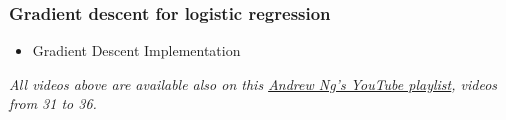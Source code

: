 \subsubsection*{Gradient descent for logistic regression}
\begin{itemize}
  \item Gradient Descent Implementation
\end{itemize}


\emph{All videos above are available also on this \href{https://youtube.com/playlist?list=PLkDaE6sCZn6FNC6YRfRQc_FbeQrF8BwGI&feature=shared}{Andrew Ng's YouTube playlist}, videos from 31 to 36.}
